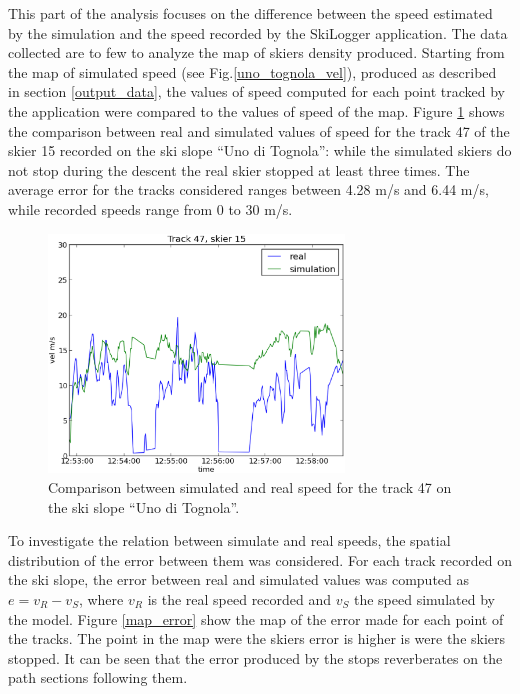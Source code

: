 \documentclass[12pt,a4paper,twoside]{book}
\begin{document}
This part of the analysis focuses on the difference between the speed estimated by the simulation and the speed recorded by the SkiLogger application. The data collected are to few to analyze the map of skiers density produced. Starting from the map of simulated speed (see Fig.\ref{uno_tognola_vel}), produced as described in section \ref{output_data}, the values of speed computed for each point tracked by the application were compared to the values of speed of the map. Figure \ref{sm_track47} shows the comparison between real and simulated values of speed for the track 47 of the skier 15 recorded on the ski slope ``Uno di Tognola'': while the simulated skiers do not stop during the descent the real skier stopped at least three times. The average error for the tracks considered ranges between 4.28 m/s and 6.44 m/s, while recorded speeds range from 0 to 30 m/s.

\begin{figure}
  \begin{center}
    \includegraphics[width=0.7\textwidth]{images/sm_track47.eps}
    \caption{Comparison between simulated and real speed for the track 47 on the ski slope ``Uno di Tognola''.}\label{sm_track47}
  \end{center}
\end{figure}

To investigate the relation between simulate and real speeds, the spatial distribution of the error between them was considered. For each track recorded on the ski slope, the error between real and simulated values was computed as $e=v_R-v_S$, where $v_R$ is the real speed recorded and $v_S$ the speed simulated by the model. Figure \ref{map_error} show the map of the error made for each point of the tracks. The point in the map were the skiers error is higher is were the skiers stopped. It can be seen that the error produced by the stops reverberates on the path sections following them.
\end{document}
